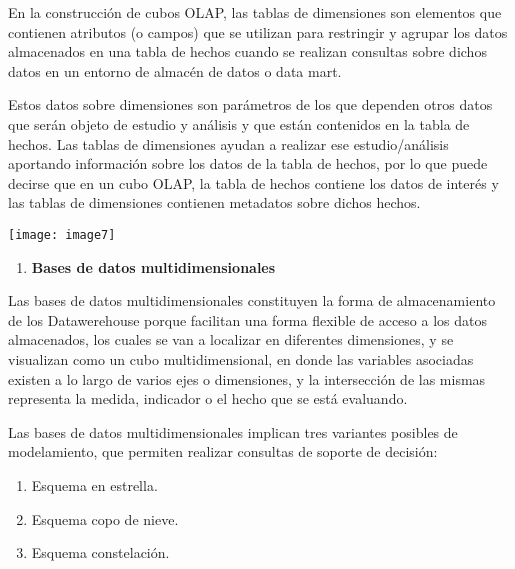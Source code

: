 \documentclass{article} %
\begin{document}
\noindent 

\noindent En la construcci\'{o}n de cubos OLAP, las tablas de dimensiones son elementos que contienen atributos (o campos) que se utilizan para restringir y agrupar los datos almacenados en una tabla de hechos cuando se realizan consultas sobre dichos datos en un entorno de almac\'{e}n de datos o data mart.

\noindent 

\noindent Estos datos sobre dimensiones son par\'{a}metros de los que dependen otros datos que ser\'{a}n objeto de estudio y an\'{a}lisis y que est\'{a}n contenidos en la tabla de hechos. Las tablas de dimensiones ayudan a realizar ese estudio/an\'{a}lisis aportando informaci\'{o}n sobre los datos de la tabla de hechos, por lo que puede decirse que en un cubo OLAP, la tabla de hechos contiene los datos de inter\'{e}s y las tablas de dimensiones contienen metadatos sobre dichos hechos.

\noindent \texttt{[image: image7]}

\noindent 

\noindent 

\begin{enumerate}
\item  \textbf{Bases de datos multidimensionales}
\end{enumerate}

\noindent 

\noindent Las bases de datos multidimensionales constituyen la forma de almacenamiento de los Datawerehouse porque facilitan una forma flexible de acceso a los datos almacenados, los cuales se van a localizar en diferentes dimensiones, y se visualizan como un cubo multidimensional, en donde las variables asociadas existen a lo largo de varios ejes o dimensiones, y la intersecci\'{o}n de las mismas representa la medida, indicador o el hecho que se est\'{a} evaluando.

\noindent 

\noindent Las bases de datos multidimensionales implican tres variantes posibles de modelamiento, que permiten realizar consultas de soporte de decisi\'{o}n:

\noindent 

\begin{enumerate}
\item  Esquema en estrella.

\item  Esquema copo de nieve.

\item  Esquema constelaci\'{o}n.
\end{enumerate}
\end{document}
